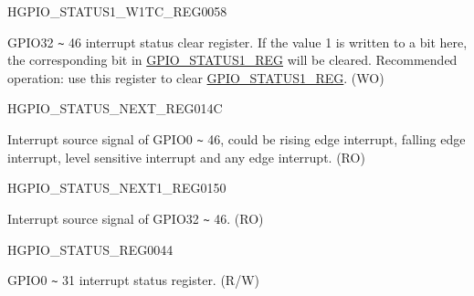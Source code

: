 \begin{register}{H}{GPIO\_STATUS1\_W1TC\_REG}{\hexprefix{}0058}\label{regdesc:GPIOSTATUS1W1TCREG}
%
%
\regnewline%
\begin{regdesc}\begin{reglist}
\label{fielddesc:GPIOSTATUS1W1TC}\item [GPIO\_STATUS1\_W1TC] GPIO32 \verb+~+ 46 interrupt status clear register. If the value 1 is written to a bit here, the corresponding bit in \hyperref[fielddesc:GPIOSTATUS1INTERRUPT]{GPIO\_STATUS1\_REG} will be cleared. Recommended operation: use this register to clear \hyperref[fielddesc:GPIOSTATUS1INTERRUPT]{GPIO\_STATUS1\_REG}. (WO)
\end{reglist}\end{regdesc}
\end{register}


\begin{register}{H}{GPIO\_STATUS\_NEXT\_REG}{\hexprefix{}014C}\label{regdesc:GPIOSTATUSNEXTREG}
%
\regnewline%
\begin{regdesc}\begin{reglist}
\label{fielddesc:GPIOSTATUSINTERRUPTNEXT}\item [GPIO\_STATUS\_INTERRUPT\_NEXT] Interrupt source signal of GPIO0 \verb+~+ 46, could be rising edge interrupt, falling edge interrupt, level sensitive interrupt and any edge interrupt. (RO)
\end{reglist}\end{regdesc}
\end{register}


\begin{register}{H}{GPIO\_STATUS\_NEXT1\_REG}{\hexprefix{}0150}\label{regdesc:GPIOSTATUSNEXT1REG}
%
%
\regnewline%
\begin{regdesc}\begin{reglist}
\label{fielddesc:GPIOSTATUS1INTERRUPTNEXT}\item [GPIO\_STATUS1\_INTERRUPT\_NEXT] Interrupt source signal of GPIO32 \verb+~+ 46. (RO)
\end{reglist}\end{regdesc}
\end{register}


\begin{register}{H}{GPIO\_STATUS\_REG}{\hexprefix{}0044}\label{regdesc:GPIOSTATUSREG}
%
\regnewline%
\begin{regdesc}\begin{reglist}
\label{fielddesc:GPIOSTATUSINTERRUPT}\item [GPIO\_STATUS\_INTERRUPT] GPIO0 \verb+~+ 31 interrupt status register. (R/W)
\end{reglist}\end{regdesc}
\end{register}


